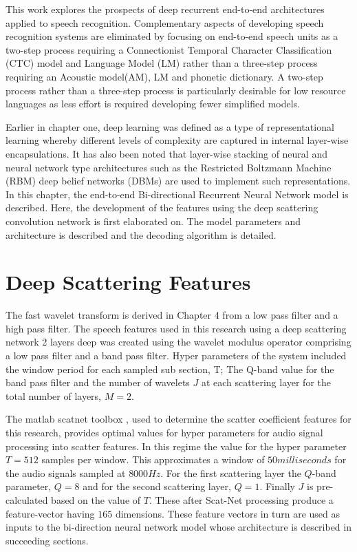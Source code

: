 This work explores the prospects of deep recurrent end-to-end architectures applied to speech recognition. Complementary aspects of developing speech recognition systems are eliminated by focusing on end-to-end speech units as a two-step process requiring a Connectionist Temporal Character Classification (CTC)\cite{graves2006connectionist} model and Language Model (LM) rather than a three-step process requiring an Acoustic model(AM), LM and phonetic dictionary. A two-step process rather than a three-step process is particularly desirable for low resource languages as less effort is required developing fewer simplified models.

Earlier in chapter one, deep learning was defined as a type of representational learning whereby different levels of complexity are captured in internal layer-wise encapsulations. It has also been noted that layer-wise stacking of neural and neural network type architectures such as the Restricted Boltzmann Machine (RBM) deep belief networks (DBMs) are used to implement such representations. In this chapter, the end-to-end Bi-directional Recurrent Neural Network model is described. Here, the development of the features using the deep scattering convolution network is first elaborated on. The model parameters and architecture is described and the decoding algorithm is detailed.

\section{Deep Scattering Features}
The fast wavelet transform is derived in Chapter 4 from a low pass filter and a high pass filter.  The speech features used in this research using a deep scattering network 2 layers deep was created using the wavelet modulus operator comprising a low pass filter and a band pass filter.   Hyper parameters of the system included the window period for each sampled sub section, T;  The Q-band value for the band pass filter and the number of wavelets $J$ at each scattering layer for the total number of layers, $M=2$.

The matlab scatnet toolbox \citep{anden2014scatnet}, used to determine the scatter coefficient features for this research, provides optimal values for hyper parameters for audio signal processing into scatter features.  In this regime the value for the hyper parameter $T=512$ samples per window. This approximates a window of $50 milliseconds$ for the audio signals sampled at $8000 Hz$.  For the first scattering layer the $Q$-band parameter, $Q=8$ and for the second scattering layer,  $Q=1$.  Finally $J$ is pre-calculated based on the value of $T$.  These after Scat-Net processing produce a feature-vector having $165$  dimensions.  These feature vectors in turn are used as inputs to the bi-direction neural network model whose architecture is described in  succeeding sections.

